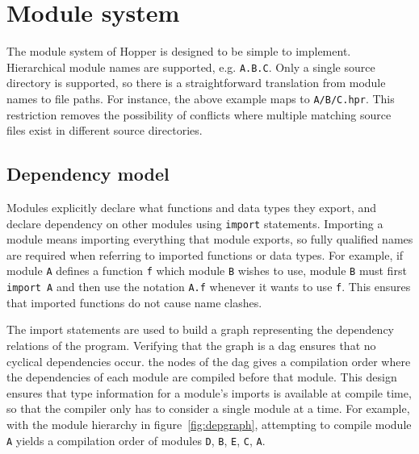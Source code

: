 \section{Module system}
\label{sec:dai_modules}

The module system of Hopper is designed to be simple to implement. Hierarchical module names are supported, e.g. \texttt{A.B.C}. Only a single source directory is supported, so there is a straightforward translation from module names to file paths. For instance, the above example maps to \texttt{A/B/C.hpr}. This restriction removes the possibility of conflicts where multiple matching source files exist in different source directories.

\subsection{Dependency model}

Modules explicitly declare what functions and data types they export, and declare dependency on other modules using \texttt{import} statements. Importing a module means importing everything that module exports, so fully qualified names are required when referring to imported functions or data types. For example, if module \texttt{A} defines a function \texttt{f} which module \texttt{B} wishes to use, module \texttt{B} must first \texttt{import A} and then use the notation \texttt{A.f} whenever it wants to use \texttt{f}. This ensures that imported functions do not cause name clashes.

The import statements are used to build a graph representing the dependency relations of the program. Verifying that the graph is a \gls{dag} ensures that no cyclical dependencies occur.  the nodes of the \gls{dag} gives a compilation order where the dependencies of each module are compiled before that module. This design ensures that type information for a module's imports is available at compile time, so that the compiler only has to consider a single module at a time. For example, with the module hierarchy in figure~\ref{fig:depgraph}, attempting to compile module \texttt{A} yields a compilation order of modules \texttt{D}, \texttt{B}, \texttt{E}, \texttt{C}, \texttt{A}.

